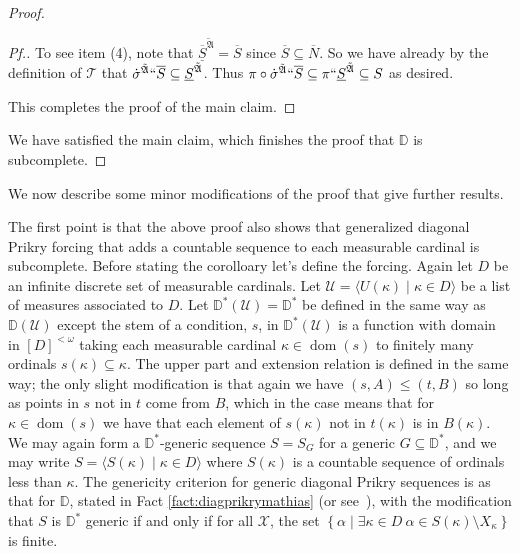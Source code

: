 \documentclass{amsart}
\theoremstyle{definition}
\theoremstyle{remark}
\newcommand{\D}{\mathbb{D}}
\newcommand{\U}{\mathcal{U}}
\DeclareMathOperator{\dom}{dom}
\newcommand{\st}{\; | \;}
\newcommand{\set}[2]{\left\{#1\st #2 \right\}}
\newcommand{\seq}[2]{\langle #1 \st #2 \rangle}
\begin{document}
\begin{proof}
\begin{proof}[Pf.]
To see item (4), note that $\overline{\underline S}^{\tilde{\mathfrak A}} = \overline S$ since $\overline S \subseteq \overline N$. So we have already by the definition of $\mathcal T$  that $\dot{\sigma}^{\tilde{\mathfrak A}}``\overline S \subseteq \underline S^{\tilde{\mathfrak A}}$. Thus $\pi \circ \dot{\sigma}^{\tilde{\mathfrak A}}``\overline S \subseteq \pi `` \underline S^{\tilde{\mathfrak A}} \subseteq S$ as desired. %

This completes the proof of the main claim.
\end{proof}
We have satisfied the main claim, which finishes the proof that $\D$ is subcomplete.
\end{proof}

We now describe some minor modifications of the proof that give further results.

The first point is that the above proof also shows that generalized diagonal Prikry forcing that adds a countable sequence to each measurable cardinal is subcomplete. Before stating the corolloary let's define the forcing. Again let $D$ be an infinite discrete set of measurable cardinals. Let $\U = \seq{ U(\kappa) }{ \kappa \in D }$ be a list of measures associated to $D$. 
Let $\D^*(\U) = \D^*$ be defined in the same way as $\D(\U)$ except the stem of a condition, $s$, in $\D^*(\U)$ is a function with domain in $[D]^{<\omega}$ taking each measurable cardinal $\kappa \in \dom(s)$ to finitely many ordinals $s(\kappa) \subseteq \kappa$. The upper part and extension relation is defined in the same way; the only slight modification is that again we have $(s, A) \leq (t, B)$ so long as points in $s$ not in $t$ come from $B$, which in the case means that for $\kappa \in \dom(s)$ we have that each element of $s(\kappa)$ not in $t(\kappa)$ is in $B(\kappa)$. 
We may again form a $\D^*$-generic sequence $S = S_G$ for a generic $G \subseteq \D^*$, and we may write $S = \seq{ S(\kappa) }{ \kappa \in D }$ where $S(\kappa)$ is a countable sequence of ordinals less than $\kappa$. The genericity criterion for generic diagonal Prikry sequences is as that for $\D$, stated in Fact \ref{fact:diagprikrymathias} (or see~\cite[Theorem 1]{Fuchs:2005kx}), with the modification that $S$ is $\D^*$ generic if and only if for all $\mathcal X$, the set $\set{ \alpha }{ \exists \kappa \in D \ \alpha \in S(\kappa) \setminus X_\kappa }$ is finite.
\end{document}

